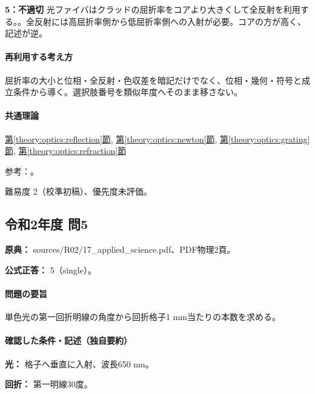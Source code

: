 \noindent\textbf{5：不適切} 光ファイバはクラッドの屈折率をコアより大きくして全反射を利用する。。全反射には高屈折率側から低屈折率側への入射が必要。コアの方が高く、記述が逆。\par

\paragraph{再利用する考え方} 屈折率の大小と位相・全反射・色収差を暗記だけでなく、位相・幾何・符号と成立条件から導く。選択肢番号を類似年度へそのまま移さない。

\paragraph{共通理論} \hyperref[theory:optics:reflection]{第\ref*{theory:optics:reflection}節}, \hyperref[theory:optics:newton]{第\ref*{theory:optics:newton}節}, \hyperref[theory:optics:grating]{第\ref*{theory:optics:grating}節}, \hyperref[theory:optics:refraction]{第\ref*{theory:optics:refraction}節}

\par 参考：\cite{os_fiber,os_thinfilm,os_lens}。

\par 難易度 2（校準初稿）、優先度未評価。

\subsection{令和2年度 問5}
\label{q:r02-reg-applied-05}

\noindent\textbf{原典：} sources/R02/17\_applied\_science.pdf、PDF物理2頁。

\textbf{公式正答：} 5（single）。

\paragraph{問題の要旨} 単色光の第一回折明線の角度から回折格子1 mm当たりの本数を求める。

\paragraph{確認した条件・記述（独自要約）}\mbox{}\par

\noindent\textbf{光：} 格子へ垂直に入射、波長650 nm。\par

\noindent\textbf{回折：} 第一明線30度。\par

